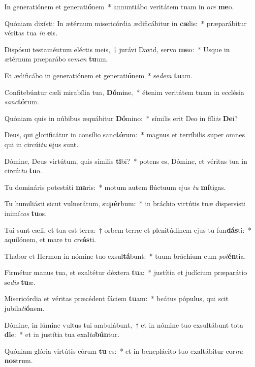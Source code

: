 \item In generatiónem et generati\textbf{ó}nem~* annuntiábo veritátem tuam in o\textit{re} \textbf{me}o.
\item Quóniam dixísti: In ætérnum misericórdia ædificábitur in \textbf{cæ}lis:~* præparábitur véritas tua \textit{in} \textbf{e}is.
\item Dispósui testaméntum eléctis meis,~† jurávi David, servo \textbf{me}o:~* Usque in ætérnum præparábo se\textit{men} \textbf{tu}um.
\item Et ædificábo in generatiónem et generati\textbf{ó}nem~* se\textit{dem} \textbf{tu}am.
\item Confitebúntur cæli mirabília tua, \textbf{Dó}mine,~* étenim veritátem tuam in ecclésia \textit{sanc}\textbf{tó}rum.
\item Quóniam quis in núbibus æquábitur \textbf{Dó}mino:~* símilis erit Deo in fíli\textit{is} \textbf{De}i?
\item Deus, qui glorificátur in consílio sanc\textbf{tó}rum:~* magnus et terríbilis super omnes qui in circúi\textit{tu} \textbf{e}jus sunt.
\item Dómine, Deus virtútum, quis símilis \textbf{ti}bi?~* potens es, Dómine, et véritas tua in circúi\textit{tu} \textbf{tu}o.
\item Tu domináris potestáti \textbf{ma}ris:~* motum autem flúctuum ejus \textit{tu} \textbf{mí}tigas.
\item Tu humiliásti sicut vulnerátum, su\textbf{pér}bum:~* in bráchio virtútis tuæ dispersísti inimí\textit{cos} \textbf{tu}os.
\item Tui sunt cæli, et tua est terra:~† orbem terræ et plenitúdinem ejus tu fun\textbf{dás}ti:~* aquilónem, et mare tu \textit{cre}\textbf{ás}ti.
\item Thabor et Hermon in nómine tuo exsul\textbf{tá}bunt:~* tuum bráchium cum \textit{pot}\textbf{én}tia.
\item Firmétur manus tua, et exaltétur déxtera \textbf{tu}a:~* justítia et judícium præparátio se\textit{dis} \textbf{tu}æ.
\item Misericórdia et véritas præcédent fáciem \textbf{tu}am:~* beátus pópulus, qui scit jubila\textit{ti}\textbf{ó}nem.
\item Dómine, in lúmine vultus tui ambulábunt,~† et in nómine tuo exsultábunt tota \textbf{di}e:~* et in justítia tua exal\textit{ta}\textbf{bún}tur.
\item Quóniam glória virtútis eórum \textbf{tu} es:~* et in beneplácito tuo exaltábitur cor\textit{nu} \textbf{nos}trum.
